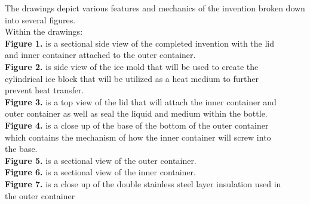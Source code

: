 \documentclass[english]{uspatent}
\begin{document}
\hspace*{0.5cm} The drawings depict various features and mechanics of the invention broken down into several figures.
\\ \hspace*{0.5cm} Within the drawings:
\\ \hspace*{1.5cm} \textbf{Figure 1.} is a sectional side view of the completed invention with the lid \\\hspace*{2.0cm} and inner container attached to the outer container.
\\ \hspace*{1.5cm} \textbf{Figure 2.} is side view of the ice mold that will be used to create the \\\hspace*{2.0cm} cylindrical ice block that will be utilized as a heat medium to further \\\hspace*{2.0cm} prevent heat transfer.
\\ \hspace*{1.5cm} \textbf{Figure 3.} is a top view of the lid that will attach the inner container and \\\hspace*{2.0cm} outer container as well as seal the liquid and medium within the bottle.
\\ \hspace*{1.5cm} \textbf{Figure 4.} is a close up of the base of the bottom of the outer container \\\hspace*{2.0cm} which contains the mechanism of how the inner container will screw into \\\hspace*{2.0cm} the base.
\\ \hspace*{1.5cm} \textbf{Figure 5.}  is a sectional view of the outer container.
\\ \hspace*{1.5cm} \textbf{Figure 6.} is a sectional view of the inner container.
\\ \hspace*{1.5cm} \textbf{Figure 7.} is a close up of the double stainless steel layer insulation used in \\\hspace*{2.0cm} the outer container 
\end{document}
